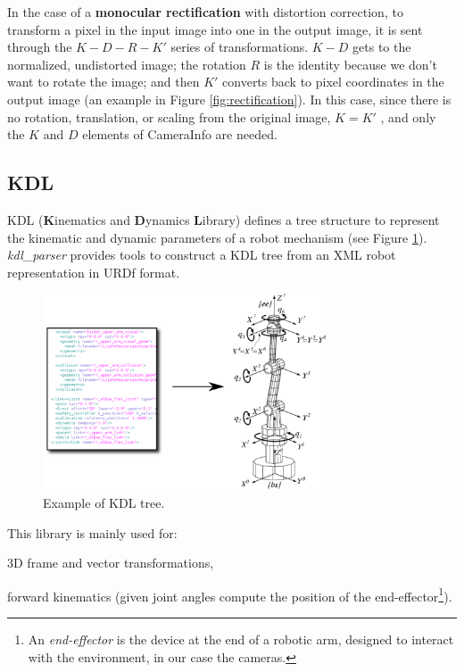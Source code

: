 In the case of a \textbf{monocular rectification} with distortion correction, to transform a pixel in the input image into one in the output image, it is sent through the $K - D - R - K'$ series of transformations. $K - D$ gets to the normalized, undistorted image; the rotation $R$ is the identity because we don't want to rotate the image; and then $K'$ converts back to pixel coordinates in the output image (an example in Figure \ref{fig:rectification}). In this case, since there is no rotation, translation, or scaling from the original image, $K = K'$ , and only the $K$ and $D$ elements of CameraInfo are needed.




\subsection{KDL}
\label{sec:KDL}

KDL (\textbf{K}inematics and \textbf{D}ynamics \textbf{L}ibrary) defines a tree structure to represent the kinematic and dynamic parameters of a robot mechanism (see Figure \ref{fig:KDL}). \textit{kdl\_parser} provides tools to construct a KDL tree from an XML robot representation in URDf format.

\begin{figure}[!htbp]
 \centering
 \includegraphics[width=0.75\textwidth]{images/KDL02.png}
 \caption{Example of KDL tree.}
 \label{fig:KDL}
\end{figure}

This library is mainly used for:
\begin{itemize*}
 \item 3D frame and vector transformations,
 \item forward kinematics (given joint angles compute the position of the end-effector\footnote{An \textit{end-effector} is the device at the end of a robotic arm, designed to interact with the environment, in our case the cameras.}).
\end{itemize*}


